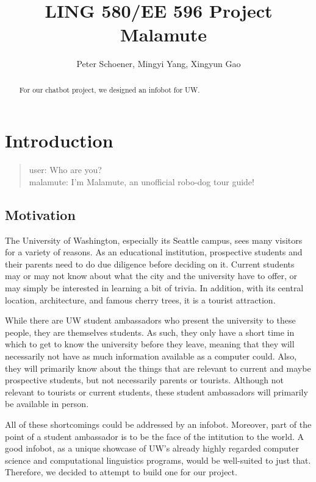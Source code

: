 \documentclass[11pt]{article}
\title{LING 580/EE 596 Project \textemdash\ Malamute}
\author{Peter Schoener, Mingyi Yang, Xingyun Gao}
\date{}
\begin{document}
\maketitle
\begin{abstract}
	For our chatbot project, we designed an infobot for UW.
\end{abstract}

\section{Introduction}

\begin{quote}
	user: Who are you? \\
	malamute: I'm Malamute, an unofficial robo-dog tour guide!
\end{quote}

\subsection{Motivation}

The University of Washington, especially its Seattle campus, sees many visitors for a variety of reasons. As an educational institution, prospective students and their parents need to do due diligence before deciding on it. Current students may or may not know about what the city and the university have to offer, or may simply be interested in learning a bit of trivia. In addition, with its central location, architecture, and famous cherry trees, it is a tourist attraction.

While there are UW student ambassadors who present the university to these people, they are themselves students. As such, they only have a short time in which to get to know the university before they leave, meaning that they will necessarily not have as much information available as a computer could. Also, they will primarily know about the things that are relevant to current and maybe prospective students, but not necessarily parents or tourists. Although not relevant to tourists or current students, these student ambassadors will primarily be available in person.

All of these shortcomings could be addressed by an infobot. Moreover, part of the point of a student ambassador is to be the face of the intitution to the world. A good infobot, as a unique showcase of UW's already highly regarded computer science and computational linguistics programs, would be well-suited to just that. Therefore, we decided to attempt to build one for our project.
\end{document}
